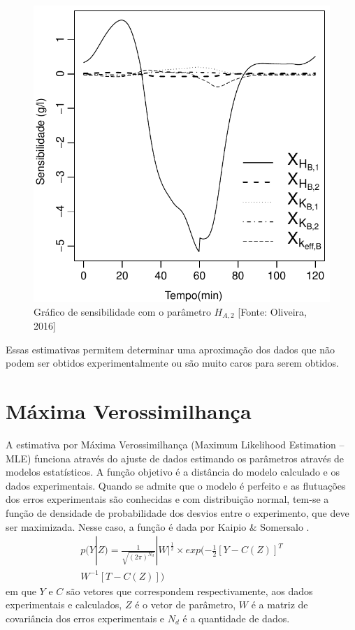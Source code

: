 \documentclass[por]{Template_SBEF}
\begin{document}
\begin{figure}[H] 
	\centering
	\includegraphics[width=.8\columnwidth]{Arquivos/SensibilidadeCb-all.pdf} 
	\caption{Gráfico de sensibilidade com o parâmetro $H_{A,2}$ [Fonte: Oliveira, 2016]} 
\end{figure}


Essas estimativas permitem determinar uma aproximação dos dados que não podem ser obtidos experimentalmente ou são muito caros para serem obtidos.
\section{Máxima Verossimilhança}
A estimativa por Máxima Verossimilhança (Maximum Likelihood Estimation – MLE) funciona através do ajuste de dados estimando os parâmetros através de modelos estatísticos. A função objetivo é a distância do modelo calculado e os dados experimentais. Quando se admite que o modelo é perfeito e as flutuações dos erros experimentais são conhecidas e com distribuição normal, tem-se a função de densidade de probabilidade dos desvios entre o experimento, que deve ser maximizada. Nesse caso, a função é dada por Kaipio \& Somersalo \cite{kapio_book}.
\begin{equation}
\begin{split}
p(Y|Z)= \frac{1}{\sqrt{(2\pi)^{N_d}}}|W|^\frac{1}{2}\times exp(-\frac{1}{2}[Y-C(Z)]^T\\ W^{-1}[T-C(Z)])
\end{split}
\end{equation}
em que $Y$ e $C$ são vetores que correspondem respectivamente, aos dados experimentais e calculados, $Z$ é o vetor de parâmetro, $W$ é a matriz de covariância dos erros experimentais e $N_d$ é a quantidade de dados.
\end{document}
